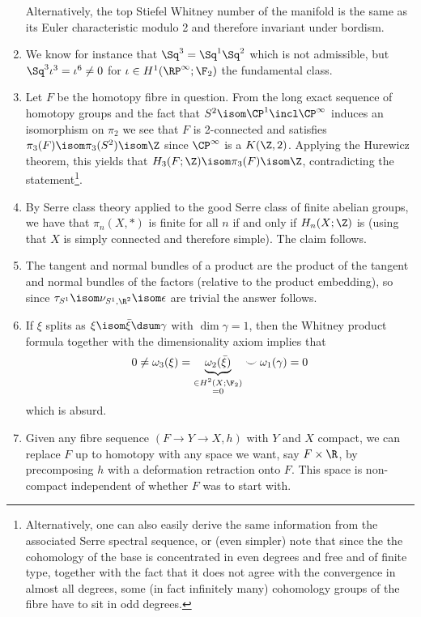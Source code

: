 \begin{answers}
\begin{enumerate}
			Alternatively, the top Stiefel Whitney number of the manifold is the same as its Euler characteristic modulo 2 and therefore invariant under bordism.
		\item {} We know for instance that $\Sq^3 = \Sq^1 \Sq^2$ which is not admissible, but $\Sq^3 \iota^3 = \iota^6 \neq 0$ for $\iota \in H^1(\RP^\infty; \F_2)$ the fundamental class.
		\item {} Let $F$ be the homotopy fibre in question.
			From the long exact sequence of homotopy groups and the fact that $S^2 \isom \CP^1 \incl \CP^\infty$ induces an isomorphism on $\pi_2$ we see that $F$ is 2-connected and satisfies $\pi_3(F) \isom \pi_3(S^2) \isom \Z$ since $\CP^\infty$ is a $K(\Z, 2)$.
			Applying the Hurewicz theorem, this yields that $H_3(F; \Z) \isom \pi_3(F) \isom \Z$, contradicting the statement\footnote{Alternatively, one can also easily derive the same information from the associated Serre spectral sequence, or (even simpler) note that since the the cohomology of the base is concentrated in even degrees and free and of finite type, together with the fact that it does not agree with the convergence in almost all degrees, some (in fact infinitely many) cohomology groups of the fibre have to sit in odd degrees.}.
		\item {} By Serre class theory applied to the good Serre class of finite abelian groups, we have that $\pi_n(X, *)$ is finite for all $n$ if and only if $H_n(X; \Z)$ is (using that $X$ is simply connected and therefore simple).
			The claim follows.
		\item {} The tangent and normal bundles of a product are the product of the tangent and normal bundles of the factors (relative to the product embedding), so since $\tau_{S^1} \isom \nu_{S^1, \R^2} \isom \epsilon$ are trivial the answer follows.
		\item {} If $\xi$ splits as $\xi \isom \bar{\xi} \dsum \gamma$ with $\dim \gamma = 1$, then the Whitney product formula together with the dimensionality axiom implies that 
			\begin{equation*}
				0 \neq \omega_3(\xi) = \underbrace{\omega_2(\bar{\xi})}_{\substack{\in H^2(X; \F_2) \\ = 0}} \smile \omega_1(\gamma) = 0
			\end{equation*}
			which is absurd.
		\item {} Given any fibre sequence $(F \to Y \to X, h)$ with $Y$ and $X$ compact, we can replace $F$ up to homotopy with any space we want, say $F \times \R$, by precomposing $h$ with a deformation retraction onto $F$.
			This space is non-compact independent of whether $F$ was to start with.
			\qedhere
	\end{enumerate}
\end{answers}
